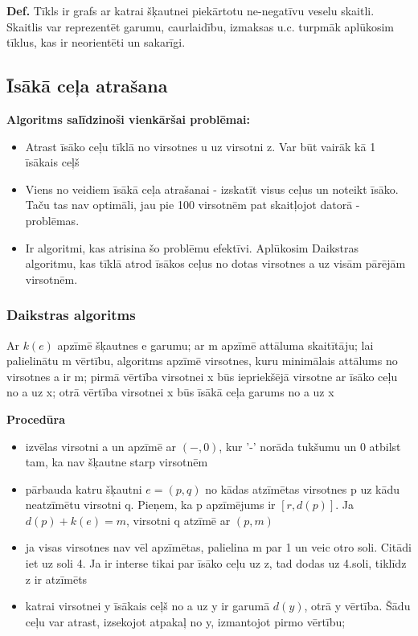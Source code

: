 \documentclass{article}
\begin{document}
\textbf{Def.}  Tīkls ir grafs ar katrai šķautnei piekārtotu ne-negatīvu veselu skaitli.  Skaitlis var reprezentēt garumu, caurlaidību, izmaksas u.c.  turpmāk aplūkosim tīklus, kas ir neorientēti un sakarīgi.

\subsection{Īsākā ceļa atrašana}

\textbf{Algoritms salīdzinoši vienkāršai problēmai:}
\begin{itemize}
	\item Atrast īsāko ceļu tīklā no virsotnes u uz virsotni z. Var būt vairāk kā 1 īsākais ceļš
	\item Viens no veidiem īsākā ceļa atrašanai - izskatīt visus ceļus un noteikt īsāko. Taču tas nav optimāli, jau pie 100 virsotnēm pat skaitļojot datorā - problēmas.
	\item Ir algoritmi, kas atrisina šo problēmu efektīvi.  Aplūkosim Daikstras algoritmu, kas tīklā atrod īsākos ceļus no dotas virsotnes a uz visām pārējām virsotnēm.
\end{itemize}

\subsubsection{Daikstras algoritms}
Ar $k(e)$ apzīmē šķautnes e garumu; ar m apzīmē attāluma skaitītāju; lai palielinātu m vērtību, algoritms apzīmē virsotnes, kuru minimālais attālums no virsotnes a ir m; pirmā vērtība virsotnei x būs iepriekšējā virsotne ar īsāko ceļu no a uz x; otrā vērtība virsotnei x būs īsākā ceļa garums no a uz x

\textbf{Procedūra}
\begin{itemize}
	\item izvēlas virsotni a un apzīmē ar $(−, 0)$, kur '-' norāda tukšumu un 0 atbilst tam, ka nav šķautne starp virsotnēm
	\item pārbauda katru šķautni $e = (p, q)$ no kādas atzīmētas virsotnes p uz kādu neatzīmētu virsotni q. Pieņem, ka p apzīmējums ir $[r , d(p)]$. Ja $d(p) + k(e) = m$, virsotni q atzīmē ar $(p, m)$
	\item ja visas virsotnes nav vēl apzīmētas, palielina m par 1 un veic otro soli. Citādi iet uz soli 4. Ja ir interse tikai par īsāko ceļu uz z, tad dodas uz 4.soli, tiklīdz z ir atzīmēts
	\item katrai virsotnei y īsākais ceļš no a uz y ir garumā $d(y)$, otrā y vērtība. Šādu ceļu var atrast, izsekojot atpakaļ no y, izmantojot pirmo vērtību;
\end{itemize}
\end{document}
